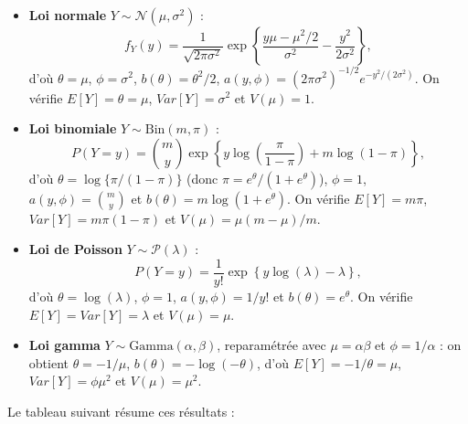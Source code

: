 \documentclass[
  french,
  letterpaper,
  DIV=11,
  numbers=noendperiod]{scrreprt}
\begin{document}
\begin{itemize}
\item
  \textbf{Loi normale} \(Y\sim\mathcal{N}(\mu,\sigma^2)\) :
  \[f_Y(y) = \frac{1}{\sqrt{2\pi\sigma^2}}\exp\left\{\frac{y\mu - \mu^2/2}{\sigma^2} - \frac{y^2}{2\sigma^2}\right\},\]
  d'où \(\theta = \mu\), \(\phi = \sigma^2\),
  \(b(\theta) = \theta^2/2\),
  \(a(y,\phi) = (2\pi\sigma^2)^{-1/2}e^{-y^2/(2\sigma^2)}\). On vérifie
  \(E[Y] = \theta = \mu\), \(Var[Y] = \sigma^2\) et \(V(\mu) = 1\).
\item
  \textbf{Loi binomiale} \(Y\sim\mathrm{Bin}(m,\pi)\) :
  \[P(Y=y) = \binom{m}{y}\exp\left\{y\log\!\left(\frac{\pi}{1-\pi}\right) + m\log(1-\pi)\right\},\]
  d'où \(\theta = \log\{\pi/(1-\pi)\}\) (donc
  \(\pi = e^\theta/(1+e^\theta)\)), \(\phi = 1\),
  \(a(y,\phi) = \binom{m}{y}\) et \(b(\theta) = m\log(1+e^\theta)\). On
  vérifie \(E[Y] = m\pi\), \(Var[Y] = m\pi(1-\pi)\) et
  \(V(\mu) = \mu(m-\mu)/m\).
\item
  \textbf{Loi de Poisson} \(Y\sim\mathcal{P}(\lambda)\) :
  \[P(Y=y) = \frac{1}{y!}\exp\left\{y\log(\lambda) - \lambda\right\},\]
  d'où \(\theta = \log(\lambda)\), \(\phi = 1\), \(a(y,\phi) = 1/y!\) et
  \(b(\theta) = e^\theta\). On vérifie \(E[Y] = Var[Y] = \lambda\) et
  \(V(\mu) = \mu\).
\item
  \textbf{Loi gamma} \(Y\sim\mathrm{Gamma}(\alpha,\beta)\), reparamétrée
  avec \(\mu = \alpha\beta\) et \(\phi = 1/\alpha\) : on obtient
  \(\theta = -1/\mu\), \(b(\theta) = -\log(-\theta)\), d'où
  \(E[Y] = -1/\theta = \mu\), \(Var[Y] = \phi\mu^2\) et
  \(V(\mu) = \mu^2\).
\end{itemize}

Le tableau suivant résume ces résultats :
\end{document}
